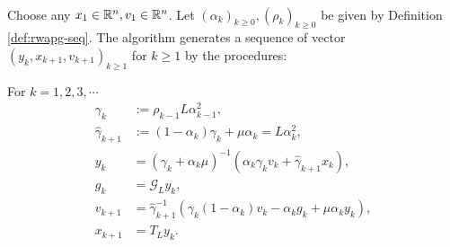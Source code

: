 \documentclass[12pt]{article}
\begin{document}
\begin{observation}
    \end{observation}
    \begin{definition}\label{def:wapg}
        \; \\
        Choose any $x_1 \in \mathbb R^n, v_1 \in \mathbb R^n$. 
        Let $(\alpha_k)_{k \ge0}, (\rho_k)_{k \ge 0}$ be given by Definition \ref{def:rwapg-seq}. 
        The algorithm generates a sequence of vector $(y_k, x_{k + 1}, v_{k + 1})_{k \ge 1}$ for $k\ge 1$ by the procedures:  
        \begin{tcolorbox}
            For $k=1, 2, 3, \cdots$
            \begin{align*}
                \gamma_k &:= \rho_{k -1}L\alpha_{k - 1}^2, 
                \\
                \hat \gamma_{k + 1} & := (1 - \alpha_k)\gamma_k + \mu \alpha_k = L\alpha_k^2, 
                \\
                y_k &= 
                (\gamma_k + \alpha_k \mu)^{-1}(\alpha_k \gamma_k v_k + \hat\gamma_{k + 1} x_k), 
                \\
                g_k &= \mathcal G_L y_k, 
                \\
                v_{k + 1} &= 
                \hat\gamma^{-1}_{k + 1}
                (\gamma_k(1 - \alpha_k) v_k - \alpha_k g_k + \mu \alpha_k y_k), 
                \\
                x_{k + 1} &= T_L y_k. 
            \end{align*}    
        \end{tcolorbox}
    \end{definition}
\end{document}
